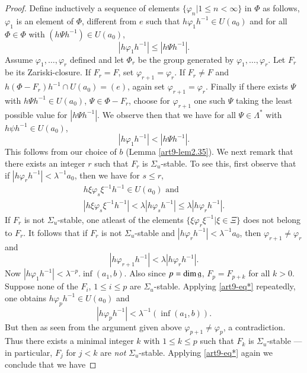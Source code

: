 \begin{proof}
Define inductively a sequence of elements $\{\varphi_n \big| 1 \leqslant n < \infty\}$ in $\Phi$ as follows, $\varphi_1$ is an element of $\Phi$, different from $e$ such that $h\varphi_1 h^{-1} \in U (a_0)$ and for all $\Phi \in \Phi$ with $(h \Psi h^{-1}) \in U (a_0)$,
$$
|h\varphi_1 h^{-1}| \leqslant |h\Psi h^{-1}|.
$$
Assume $\varphi_1, \ldots, \varphi_r$ defined and let $\Phi_r$ be the group generated by $\varphi_1, \ldots, \varphi_r$. Let $F_r$ be its Zariski-closure. If $F_r = F$, set $\varphi_{r+1} = \varphi_r$. If $F_r \neq F$ and $h (\Phi-F_r) h^{-1} \cap U (a_0) = (e)$, again set $\varphi_{r+1} = \varphi_r$. Finally if there exists $\Psi$ with $h \Psi h^{-1} \in U (a_0)$, $\Psi \in \Phi - F_r$, choose for $\varphi_{r+1}$ one such $\Psi$ taking the least possible value for $|h\Psi h^{-1}|$. We observe then that we have for all $\Psi \in \Lambda^\ast$ with $h \psi h^{-1} \in U (a_0)$,
$$
|h \varphi_1 h^{-1}| < |h \Psi h^{-1}|.
$$
This follows from our choice of $b$ (Lemma \ref{art9-lem2.35}). We next remark that there exists an integer $r$ such that $F_r$ is $\Sigma_u$-stable. To see this, first observe that if $|h\varphi_r h^{-1}| < \lambda^{-1} a_0$, then we have for $s \leqslant r$,
\begin{gather*}
h \xi \varphi_s \xi^{-1} h^{-1} \in U (a_0) \text{ and }\\
|h \xi \varphi_s \xi^{-1} h^{-1}| < \lambda |h\varphi_s h^{-1}| \leqslant \lambda | h \varphi_r h^{-1}|.
\end{gather*}
If $F_r$ is not $\Sigma_u$-stable, one atleast of the elements $\{\xi \varphi_r \xi^{-1} \big| \xi \in \Xi\}$ does not belong to $F_r$. It follows that if $F_r$ is not $\Sigma_u$-stable and $|h \varphi_r h^{-1} | < \lambda^{-1} a_0$, then $\varphi_{r+1} \neq \varphi_r$ and
\begin{equation*}
|h\varphi_{r+1} h^{-1}| < \lambda |h \varphi_r h^{-1}|. \tag*{($\ast$)}\label{art9-eq*}
\end{equation*}
Now $|h \varphi_1 h^{-1}| < \lambda^{-p}. \inf(a_1, b)$. Also since $p = \dim \mathfrak{g}$, $F_p = F_{p+k}$ for all $k>0$. Suppose none of the $F_i$, $1 \leqslant i \leqslant p$ are $\Sigma_u$-stable. Applying \ref{art9-eq*} repeatedly, one obtains $h\varphi_p h^{-1} \in U (a_0)$ and 
$$
|h \varphi_p h ^{-1}| < \lambda^{-1} (\inf (a_1, b)).
$$\pageoriginale 
But then as seen from the argument given above $\varphi_{p+1} \neq \varphi_p$, a contradiction. Thus there exists a minimal integer $k$ with $1 \leqslant k \leqslant p$ such that $F_k$ is $\Sigma_u$-stable ---  in particular, $F_j$ for $j<k$ are \textit{not} $\Sigma_u$-stable. Applying \ref{art9-eq*} again we conclude that we have

\end{proof}
